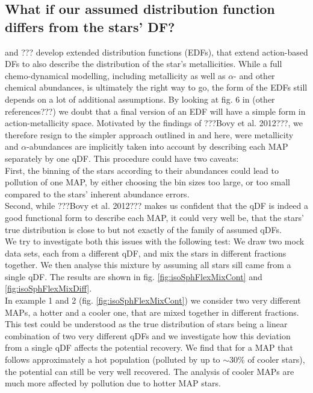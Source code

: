 \subsection{What if our assumed distribution function differs from the stars' DF?}

\cite{san15} and ??? develop extended distribution functions (EDFs), that extend action-based DFs to also describe the distribution of the star's metallicities. While a full chemo-dynamical modelling,  including metallicity as well as $\alpha$- and other chemical abundances, is ultimately the right way to go, the form of the EDFs still depends on a lot of additional assumptions. By looking at fig. 6 in \cite{bov13} (other references???) we doubt that a final version of an EDF will have a simple form in action-metallicity space. Motivated by the findings of ???Bovy et al. 2012???, we therefore resign to the simpler approach outlined in \cite{bov13} and here, were metallicity and $\alpha$-abundances are implicitly taken into account by describing each MAP separately by one qDF. This procedure could have two caveats: 
\\First, the binning of the stars according to their abundances could lead to pollution of one MAP, by either choosing the bin sizes too large, or too small compared to the stars' inherent abundance errors. 
\\Second, while ???Bovy et al. 2012??? makes us confident that the qDF is indeed a good functional form to describe each MAP, it could very well be, that the stars' true distribution is close to but not exactly of the family of assumed qDFs. 
\\We try to investigate both this issues with the following test: We draw two mock data sets, each from a different qDF, and mix the stars in different fractions together. We then analyse this mixture by assuming all stars sill came from a single qDF. The results are shown in fig. \ref{fig:isoSphFlexMixCont} and \ref{fig:isoSphFlexMixDiff}. 
\\In example 1 and 2 (fig. \ref{fig:isoSphFlexMixCont}) we consider two very different MAPs, a hotter and a cooler one, that are mixed together in different fractions. This test could be understood as the true distribution of stars being a linear combination of two very different qDFs and we investigate how this deviation from a single qDF affects the potential recovery. We find that for a MAP that follows approximately a hot population (polluted by up to $\sim30\%$ of cooler stars), the potential can still be very well recovered. The analysis of cooler MAPs are much more affected by pollution due to hotter MAP stars.
